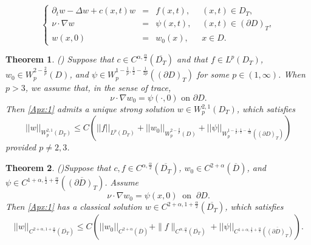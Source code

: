 \documentclass[twoside,10pt]{article}
\newtheorem{theorem}{\bf Theorem}[section]
\numberwithin{equation}{section}
\begin{document}
\begin{equation}\label{Apx:1}
	\left\{
	\begin{array}{rcll}
		\partial_t w-\Delta w + c(x,t)w&=& f(x,t),\;\; &(x,t)\in D_T, \\
		\nu\cdot \nabla w &=&\psi(x,t), &(x,t)\in (\partial D)_T,\\
w(x,0)&=&w_0(x),&x\in D.
	\end{array}
	\right.
\end{equation}

\begin{theorem}\emph{(\cite[Theorem\,17]{Sol64})} \label{thm:apx1}
	Suppose that $c\in C^{\alpha,\frac{\alpha}{2}}(\overline{D_T})$ and that $f\in L^p(D_T)$, $w_0\in W_p^{2-\frac{2}{p}}(D)$, and $\psi \in W_p^{1-\frac{1}{p},\frac{1}{2}-\frac{1}{2p}}((\partial D)_T)$ for some $p\in (1,\infty)$.
 When $p>3$, we assume that, in the sense of trace,
 $$\nu \cdot \nabla w_0=\psi(\cdot,0) \mbox{~on~} \partial D.$$
Then  \eqref{Apx:1} admits a unique strong solution $w\in W_p^{2,1}(D_T)$, which satisfies
	\begin{equation}\label{B.2}
		||w||_{W^{2,1}_p(D_T)} \le  C \left( ||f||_{L^p(D_T)} + ||w_0||_{W^{2-\frac{2}{p}}_p(D)} + ||\psi||_{W^{1-\frac{1}{p},\frac{1}{2}-\frac{1}{2p}}_p((\partial D)_T)}\right)
	\end{equation}
provided $p\neq 2,3$.
\end{theorem}


\begin{theorem}\emph{(\cite[Corollary\,5.1.22]{Lunardi1995})}\label{thm:apx2}
	Suppose that $c,f\in C^{\alpha,\frac{\alpha}{2}}(\overline{D_T})$, $w_0\in C^{2+\alpha}(\overline{D})$, and
	$\psi\in C^{1+\alpha,\frac{1}{2}+\frac{\alpha}{2}}(\overline{(\partial D)_T})$. Assume
$$\nu\cdot \nabla w_0=\psi(x,0)\;\;\mbox{on}\;\; \partial D.$$
 Then \eqref{Apx:1} has a classical solution $w\in C ^{2+\alpha,1+\frac{\alpha}{2}}(\overline{D_T})$, which satisfies
	\begin{equation}\label{B.3}
		||w||_{C^{2+\alpha,1+\frac{\alpha}{2}}(\overline{D_T})} \le C
		\left(
		||w_0||_{C^{2+\alpha}(\overline{D})}+\|f\|_{C^{\alpha,\frac{\alpha}{2}}(\overline{D_T})}
		+ ||\psi||_{C^{1+\alpha, \frac{1}{2}+ \frac{\alpha}{2}}(\overline{(\partial D)_T})}
		\right).
	\end{equation}
\end{theorem}
\end{document}

